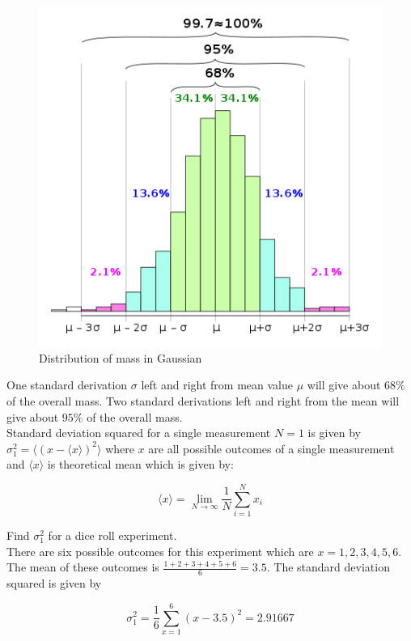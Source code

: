 \begin{figure}[H]
	\centering
	\includegraphics[width=120mm]{4.png}
	\caption{Distribution of mass in Gaussian}
\end{figure}

One standard derivation $\sigma$ left and right from mean value $\mu$ will give about $68\%$ of the overall mass. Two standard derivations left and right from the mean will give about $95\%$ of the overall mass. \\

Standard deviation squared for a single measurement $N=1$ is given by $\sigma_1^2 = \langle (x - \langle x \rangle)^2 \rangle$ where $x$ are all possible outcomes of a single measurement and $\langle x \rangle$ is theoretical mean which is given by:

$$\langle x \rangle= \lim_{N\to\infty}\frac{1}{N}\sum_{i=1}^N x_i$$

\begin{texample}
	Find $\sigma_1^2$ for a dice roll experiment. \\
	
	There are six possible outcomes for this experiment which are $x=1, 2, 3, 4, 5, 6$. The mean of these outcomes is $\frac{1+2+3+4+5+6}{6}=3.5$. The standard deviation squared is given by
	
	$$\sigma_1^2 = \frac{1}{6} \sum_{x=1}^6 \left( x - 3.5 \right)^2 = 2.91667$$
\end{texample}

